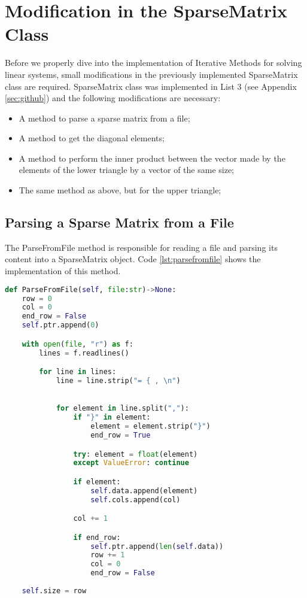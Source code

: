 \section{Modification in the SparseMatrix Class}\label{sec:modification}
Before we properly dive into the implementation of Iterative Methods for solving linear systems, small modifications in the previously implemented SparseMatrix class are required. SparseMatrix class was implemented in List 3 (see Appendix \ref{sec:github}) and the following modifications are necessary:
\begin{itemize}
    \item A method to parse a sparse matrix from a file;
    \item A method to get the diagonal elements;
    \item A method to perform the inner product between the vector made by the elements of the lower triangle by a vector of the same size;
    \item The same method as above, but for the upper triangle;
\end{itemize}

\subsection{Parsing a Sparse Matrix from a File} \label{sec:parsing}
The ParseFromFile method is responsible for reading a file and parsing its content into a SparseMatrix object. Code \ref{lst:parsefromfile} shows the implementation of this method.
\begin{lstlisting}[language=python, caption={ParseFromFile method implementation}, label={lst:parsefromfile}]
def ParseFromFile(self, file:str)->None:
    row = 0
    col = 0
    end_row = False
    self.ptr.append(0)

    with open(file, "r") as f:
        lines = f.readlines()

        for line in lines:
            line = line.strip("= { , \n")
            

            for element in line.split(","):
                if "}" in element:
                    element = element.strip("}")
                    end_row = True

                try: element = float(element)
                except ValueError: continue

                if element: 
                    self.data.append(element)
                    self.cols.append(col)

                col += 1

                if end_row:
                    self.ptr.append(len(self.data))
                    row += 1
                    col = 0
                    end_row = False
        
    self.size = row
\end{lstlisting}


